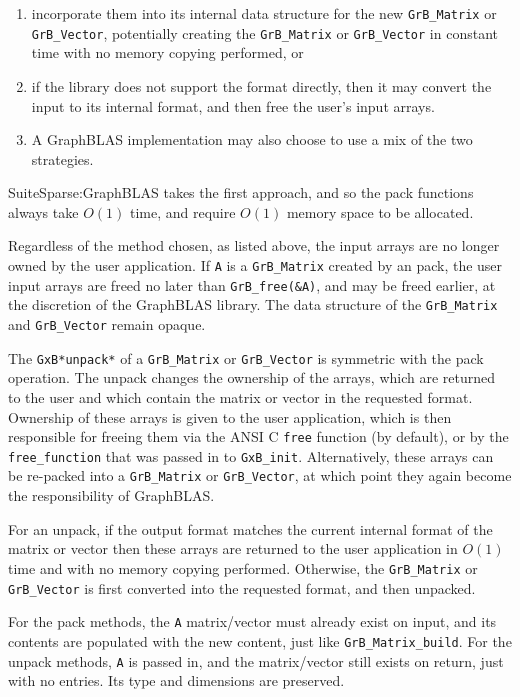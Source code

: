 \documentclass[12pt]{article}
\begin{document}
\begin{enumerate}
\item incorporate them
into its internal data structure for the new \verb'GrB_Matrix' or
\verb'GrB_Vector', potentially creating the \verb'GrB_Matrix' or
\verb'GrB_Vector' in constant time with no memory copying performed, or
\item if
the library does not support the format directly, then it may convert
the input to its internal format, and then free the user's input arrays.
\item A
GraphBLAS implementation may also choose to use a mix of the two strategies.
\end{enumerate}

SuiteSparse:GraphBLAS takes the first approach, and so the pack
functions always take $O(1)$ time, and require $O(1)$ memory space to be
allocated.

Regardless of the method chosen, as listed above, the input arrays are no
longer owned by the user application.  If \verb'A' is a \verb'GrB_Matrix'
created by an pack, the user input arrays are freed no later than
\verb'GrB_free(&A)', and may be freed earlier, at the discretion of the
GraphBLAS library.  The data structure of the \verb'GrB_Matrix' and
\verb'GrB_Vector' remain opaque.

The \verb'GxB*unpack*' of a \verb'GrB_Matrix' or \verb'GrB_Vector' is symmetric with the
pack operation.  The unpack changes the ownership of the arrays, which are
returned to the user and which contain the
matrix or vector in the requested format.  Ownership of these arrays is given
to the user application, which is then responsible for freeing them via the
ANSI C \verb'free' function (by default), or by the \verb'free_function' that
was passed in to \verb'GxB_init'.  Alternatively, these arrays can be
re-packed into a \verb'GrB_Matrix' or \verb'GrB_Vector', at which point they
again become the responsibility of GraphBLAS.

For an unpack, if the output format matches the current internal format of the
matrix or vector then these arrays are returned to the user application in
$O(1)$ time and with no memory copying performed.  Otherwise, the
\verb'GrB_Matrix' or \verb'GrB_Vector' is first converted into the requested
format, and then unpacked.

For the pack methods, the \verb'A' matrix/vector must already exist on input, and its contents are
populated with the new content, just like \verb'GrB_Matrix_build'.
For the unpack
methods, \verb'A' is passed in, and the matrix/vector still exists on return,
just with no entries.  Its type and dimensions are preserved.
\end{document}
